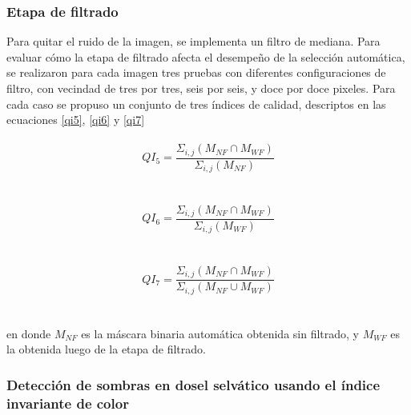 \subsubsection{Etapa de filtrado}
Para quitar el ruido de la imagen, se implementa un filtro de mediana. Para evaluar cómo la etapa de filtrado afecta el desempeño de la selección automática, se realizaron para cada imagen tres pruebas con diferentes configuraciones de filtro, con vecindad de tres por tres, seis por seis, y  doce por doce pixeles. Para cada caso se propuso un conjunto de tres índices de calidad, descriptos en las ecuaciones \ref{qi5}, \ref{qi6} y \ref{qi7}
\\
\\
 \begin{equation}
    QI_5=\frac{\Sigma _{i,j}(M_{NF}\cap M_{WF})}{\Sigma _{i,j}(M_{NF}) }
    \label{qi5}
\end{equation}
\\
\\
 \begin{equation}
    QI_6=\frac{\Sigma_{i,j}(M_{NF}\cap M_{WF})}{\Sigma _{i,j}(M_{WF}) }
    \label{qi6}
\end{equation}
\\
\\
\begin{equation}
    QI_7=\frac{\Sigma _{i,j}(M_{NF}\cap M_{WF})}{\Sigma _{i,j}(M_{NF}\cup M_{WF}) }
    \label{qi7}
\end{equation}
\\
\\
en donde $M_{NF}$ es la máscara binaria automática obtenida sin filtrado, y $M_{WF}$ es la obtenida luego de la etapa de filtrado.



\color{black} 

\subsubsection{Detección de sombras en dosel selvático usando el índice invariante de color}

